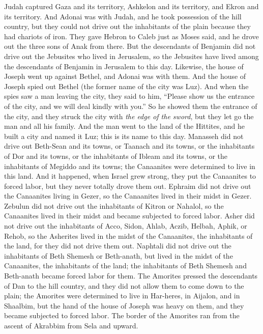 \begin{biblechapter}
\verse Judah captured Gaza and its territory, Ashkelon and its territory, and Ekron and its territory.
\verse And Adonai was with Judah, and he took possession of the hill country, but they could not drive out the inhabitants of the plain because they had chariots of iron.
\verse They gave Hebron to Caleb just as Moses said, and he drove out the three sons of Anak from there.
\verse But the descendants of Benjamin did not drive out the Jebusites who lived in Jerusalem, so the Jebusites have lived among the descendants of Benjamin in Jerusalem to this day.
\verse Likewise, the house of Joseph went up against Bethel, and Adonai was with them.
\verse And the house of Joseph spied out Bethel (the former name of the city was Luz).
\verse And when the spies saw a man leaving the city, they said to him, “Please show us the entrance of the city, and we will deal kindly with you.”
\verse So he showed them the entrance of the city, and they struck the city with \textit{the edge of the sword}, but they let go the man and all his family.
\verse And the man went to the land of the Hittites, and he built a city and named it Luz; this is its name to this day.
\verse Manasseh did not drive out Beth-Sean and its towns, or Taanach and its towns, or the inhabitants of Dor and its towns, or the inhabitants of Ibleam and its towns, or the inhabitants of Megiddo and its towns; the Canaanites were determined to live in this land.
\verse And it happened, when Israel grew strong, they put the Canaanites to forced labor, but they never totally drove them out.
\verse Ephraim did not drive out the Canaanites living in Gezer, so the Canaanites lived in their midst in Gezer.
\verse Zebulun did not drive out the inhabitants of Kitron or Nahalol, so the Canaanites lived in their midst and became subjected to forced labor.
\verse Asher did not drive out the inhabitants of Acco, Sidon, Ahlab, Aczib, Helbah, Aphik, or Rehob,
\verse so the Asherites lived in the midst of the Canaanites, the inhabitants of the land, for they did not drive them out.
\verse Naphtali did not drive out the inhabitants of Beth Shemesh or Beth-anath, but lived in the midst of the Canaanites, the inhabitants of the land; the inhabitants of Beth Shemesh and Beth-anath became forced labor for them.
\verse The Amorites pressed the descendants of Dan to the hill country, and they did not allow them to come down to the plain;
\verse the Amorites were determined to live in Har-heres, in Aijalon, and in Shaalbim, but the hand of the house of Joseph was heavy on them, and they became subjected to forced labor.
\verse The border of the Amorites ran from the ascent of Akrabbim from Sela and upward.
\end{biblechapter}

